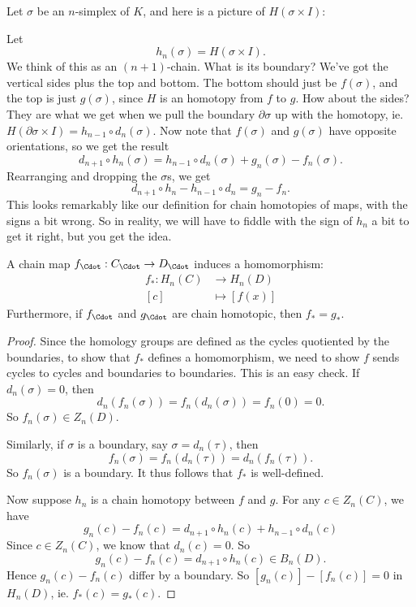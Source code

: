 \documentclass[a4paper]{article}
\begin{document}
Let $\sigma$ be an $n$-simplex of $K$, and here is a picture of $H(\sigma \times I)$:
\begin{center}
\end{center}
Let
\[
  h_n(\sigma) = H(\sigma \times I).
\]
We think of this as an $(n + 1)$-chain. What is its boundary? We've got the vertical sides plus the top and bottom. The bottom should just be $f(\sigma)$, and the top is just $g(\sigma)$, since $H$ is an homotopy from $f$ to $g$. How about the sides? They are what we get when we pull the boundary $\partial \sigma$ up with the homotopy, ie. $H(\partial \sigma \times I) = h_{n - 1} \circ d_n(\sigma)$. Now note that $f(\sigma)$ and $g(\sigma)$ have opposite orientations, so we get the result
\[
  d_{n + 1} \circ h_n(\sigma) = h_{n - 1}\circ d_n(\sigma) + g_n(\sigma) - f_n(\sigma).
\]
Rearranging and dropping the $\sigma$s, we get
\[
  d_{n + 1} \circ h_n - h_{n - 1}\circ d_n = g_n - f_n.
\]
This looks remarkably like our definition for chain homotopies of maps, with the signs a bit wrong. So in reality, we will have to fiddle with the sign of $h_n$ a bit to get it right, but you get the idea.

\begin{lemma}
  A chain map $f_{\Cdot}: C_{\Cdot} \to D_{\Cdot}$ induces a homomorphism:
  \begin{align*}
    f_*: H_n(C) &\to H_n(D)\\
    [c] &\mapsto [f(x)]
  \end{align*}
  Furthermore, if $f_{\Cdot}$ and $g_{\Cdot}$ are chain homotopic, then $f_* = g_*$.
\end{lemma}

\begin{proof}
  Since the homology groups are defined as the cycles quotiented by the boundaries, to show that $f_*$ defines a homomorphism, we need to show $f$ sends cycles to cycles and boundaries to boundaries. This is an easy check. If $d_n (\sigma) = 0$, then
  \[
    d_n (f_n(\sigma)) = f_n(d_n(\sigma)) = f_n(0) = 0.
  \]
  So $f_n(\sigma) \in Z_n(D)$.

  Similarly, if $\sigma$ is a boundary, say $\sigma = d_n (\tau)$, then
  \[
    f_n(\sigma) = f_n(d_n(\tau)) = d_n(f_n(\tau)).
  \]
  So $f_n(\sigma)$ is a boundary. It thus follows that $f_*$ is well-defined.

  Now suppose $h_n$ is a chain homotopy between $f$ and $g$. For any $c \in Z_n(C)$, we have
  \[
    g_n(c) - f_n(c) = d_{n + 1} \circ h_n(c) + h_{n - 1} \circ d_n(c)
  \]
  Since $c \in Z_n(C)$, we know that $d_n(c) = 0$. So
  \[
    g_n(c) - f_n(c) = d_{n + 1} \circ h_n(c) \in B_n(D).
  \]
  Hence $g_n(c) - f_n(c)$ differ by a boundary. So $[g_n(c)] - [f_n(c)] = 0$ in $H_n(D)$, ie. $f_*(c) = g_*(c)$.
\end{proof}
\end{document}
